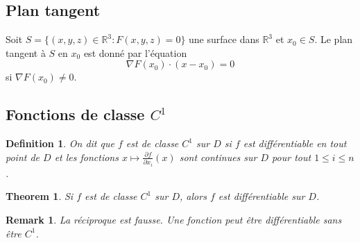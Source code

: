 \documentclass{article}
\newtheorem{theorem}{Theorem}
\newtheorem{definition}{Definition}
\newtheorem{remark}{Remark}
\begin{document}
\subsection{Plan tangent}
Soit $S = \{(x, y, z) \in \mathbb{R}^3 : F(x, y, z) = 0\}$ une surface dans $\mathbb{R}^3$ et $x_0 \in S$.
Le plan tangent à $S$ en $x_0$ est donné par l'équation
\[
\nabla F(x_0) \cdot (x - x_0) = 0
\]
si $\nabla F(x_0) \neq 0$.

\subsection{Fonctions de classe $C^1$}
\begin{definition}
On dit que $f$ est de classe $C^1$ sur $D$ si $f$ est différentiable en tout point de $D$ et les fonctions $x \mapsto \frac{\partial f}{\partial x_i}(x)$ sont continues sur $D$ pour tout $1 \leq i \leq n$.
\end{definition}

\begin{theorem}
Si $f$ est de classe $C^1$ sur $D$, alors $f$ est différentiable sur $D$.
\end{theorem}

\begin{remark}
La réciproque est fausse. Une fonction peut être différentiable sans être $C^1$.
\end{remark}
\end{document}
